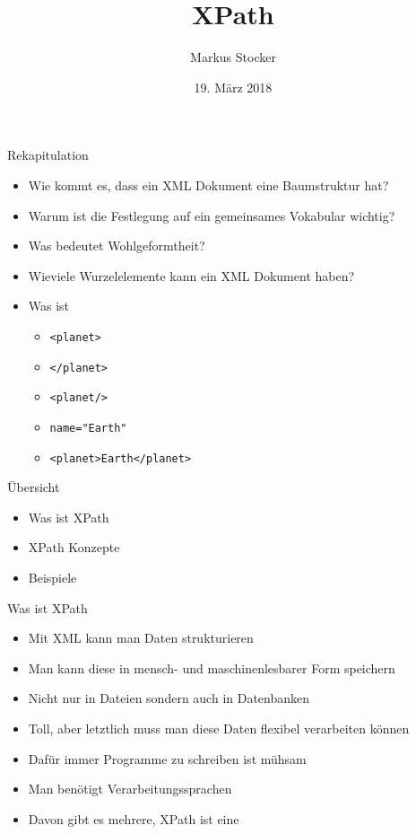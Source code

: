 \documentclass{beamer}
\title{XPath}
\author{Markus Stocker}
\date{19. März 2018}
\begin{document}
\maketitle

\begin{frame}{Rekapitulation}
	
	\begin{itemize}
		\item Wie kommt es, dass ein XML Dokument eine Baumstruktur hat?
		\item Warum ist die Festlegung auf ein gemeinsames Vokabular wichtig?
		\item Was bedeutet Wohlgeformtheit?
		\item Wieviele Wurzelelemente kann ein XML Dokument haben?
		\item Was ist 
		\begin{itemize}
			\item \texttt{<planet>}
			\item \texttt{</planet>}
			\item \texttt{<planet/>}
			\item \texttt{name="Earth"}
			\item \texttt{<planet>Earth</planet>}
		\end{itemize}
	\end{itemize}
	
\end{frame}

\begin{frame}{Übersicht}
	
	\begin{itemize}
		\item Was ist XPath
		\item XPath Konzepte
		\item Beispiele
	\end{itemize}
	
\end{frame}

\begin{frame}{Was ist XPath}
	
	\begin{itemize}
		\item Mit XML kann man Daten strukturieren
		\item Man kann diese in mensch- und maschinenlesbarer Form speichern
		\item Nicht nur in Dateien sondern auch in Datenbanken
		\item Toll, aber letztlich muss man diese Daten flexibel verarbeiten können
		\item Dafür immer Programme zu schreiben ist mühsam
		\item Man benötigt Verarbeitungssprachen
		\item Davon gibt es mehrere, XPath ist eine
	\end{itemize}
	
\end{frame}
\end{document}
